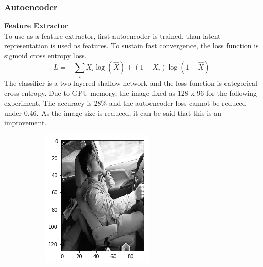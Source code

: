 \documentclass[12pt, letterpaper]{article}
\begin{document}
\subsubsection{Autoencoder}
	\textbf{Feature Extractor} \\
	 To use as a feature extractor, first autoencoder is trained, than latent representation is used as features. To sustain fast convergence, the loss function is sigmoid cross entropy loss. 
	 $$ L = - \sum_i X_{i} \log(\hat{X}) + (1 -X_{i}) \log(1-\hat{X})  $$
The classifier is a two layered shallow network and the loss function is categorical cross entropy. Due to GPU memory, the image fixed as 128 x 96 for the following experiment. The accuracy is 28\% and the autoencoder loss cannot be reduced under 0.46. As the image size is reduced, it can be said that this is an improvement.
\begin{figure}[H]
    \centering
    \begin{subfigure}[b]{0.3\textwidth}
        \includegraphics[width=\textwidth]{ae-img1}
        \label{fig:gull}
    \end{subfigure}

\end{figure}
\end{document}

